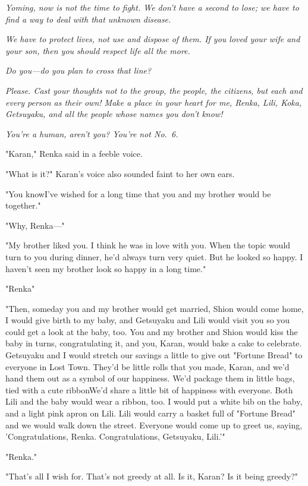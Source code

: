 \emph{Yoming, now is not the time to fight. We don't have a second to lose; we
have to find a way to deal with that unknown disease.}

\emph{We have to protect lives, not use and dispose of them. If you loved your
wife and your son, then you should respect life all the more.}

\emph{Do you---do you plan to cross that line?}

\emph{Please. Cast your thoughts not to the group, the people, the citizens,
but each and every person as their own! Make a place in your heart for
me, Renka, Lili, Koka, Getsuyaku, and all the people whose names you
don't know!}

\emph{You're a human, aren't you? You're not No.~6.}

"Karan," Renka said in a feeble voice.

"What is it?" Karan's voice also sounded faint to her own ears.

"You know\el I've wished for a long time that you and my brother would
be together."

"Why, Renka---"

"My brother liked you. I think he was in love with you. When the topic
would turn to you during dinner, he'd always turn very quiet. But he
looked so happy. I haven't seen my brother look so happy in a long
time."

"Renka\el "

"Then, someday you and my brother would get married, Shion would come
home, I would give birth to my baby, and Getsuyaku and Lili would visit
you so you could get a look at the baby, too. You and my brother and
Shion would kiss the baby in turns, congratulating it, and you, Karan,
would bake a cake to celebrate. Getsuyaku and I would stretch our
savings a little to give out "Fortune Bread" to everyone in Lost Town.
They'd be little rolls that you made, Karan, and we'd hand them out as a
symbol of our happiness. We'd package them in little bags, tied with a
cute ribbon\el We'd share a little bit of happiness with everyone. Both
Lili and the baby would wear a ribbon, too. I would put a white bib on
the baby, and a light pink apron on Lili. Lili would carry a basket full
of "Fortune Bread" and we would walk down the street. Everyone would
come up to greet us, saying, 'Congratulations, Renka. Congratulations,
Getsuyaku, Lili.'"

"Renka."

"That's all I wish for. That's not greedy at all. Is it, Karan? Is it
being greedy?"

